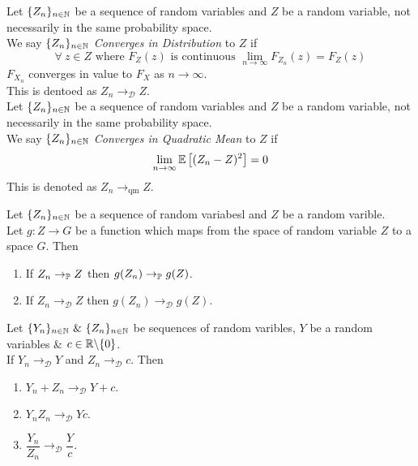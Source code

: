 \documentclass[11pt,a4paper]{article}
\begin{document}
Let $\{Z_n\}_{n\in\mathbb{N}}$ be a sequence of random variables and $Z$ be a random variable, not necessarily in the same probability space.\\
We say $\{Z_n\}_{n\in\mathbb{N}}$ \textit{Converges in Distribution} to $Z$ if
$$\forall\ z\in Z\text{ where }F_Z(z)\text{ is continuous }\lim_{n\to\infty}F_{Z_n}(z)=F_Z(z)$$
\ie $F_{X_n}$ converges in value to $F_X$ as $n\to\infty$.\\
\nb This is dentoed as $Z_n\to_\mathcal{D}Z$.\\

Let $\{Z_n\}_{n\in\mathbb{N}}$ be a sequence of random variables and $Z$ be a random variable, not necessarily in the same probability space.\\
We say $\{Z_n\}_{n\in\mathbb{N}}$ \textit{Converges in Quadratic Mean} to $Z$ if
$$\lim_{n\to\infty}\mathbb{E}\left[(Z_n-Z)^2\right]=0$$
\nb This is denoted as $Z_n\to_\text{qm}Z$.\\




Let $\{Z_n\}_{n\in\mathbb{N}}$ be a sequence of random variabesl and $Z$ be a random varible.\\
Let $g:Z\to G$ be a function which maps from the space of random variable $Z$ to a space $G$. Then
\begin{enumerate}
	\item If $Z_n\to_{\mathbb{P}} Z$ then $g(Z_n)\to_{\mathbb{P}} g(Z)$.
	\item If $Z_n\to_\mathcal{D}Z$ then $g(Z_n)\to_\mathcal{D}g(Z)$.
\end{enumerate}

Let $\{Y_n\}_{n\in\nats}\ \&\ \{Z_n\}_{n\in\nats}$ be sequences of random varibles, $Y$ be a random variables \& $c\in\mathbb{R}\backslash\{0\}$.\\
If $Y_n\to_\mathcal{D} Y$ and $Z_n\to_\mathcal{D} c$. Then
\begin{enumerate}
	\item $Y_n+Z_n\to_\mathcal{D}Y+c$.
	\item $Y_nZ_n\to_\mathcal{D}Yc$.
	\item $\dfrac{Y_n}{Z_n}\to_\mathcal{D}\dfrac{Y}{c}$.
\end{enumerate}
\end{document}
